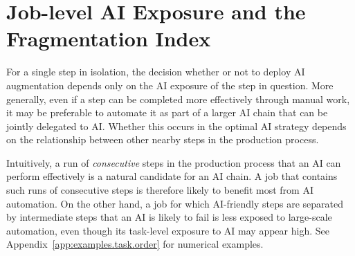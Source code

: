 
\section{Job-level AI Exposure and the Fragmentation Index}
\label{sec:fragmentation}

For a single step in isolation, the decision whether or not to deploy AI augmentation depends 
only on the AI exposure of the step in question. 
More generally, even if a step can be completed more effectively through manual work, it may be preferable to automate it as part of a larger AI chain that can be jointly delegated to AI.  
Whether this occurs in the optimal AI strategy depends on the relationship between other nearby steps in the production process.

Intuitively, a run of \emph{consecutive} steps in the production process that an AI can perform effectively is a natural candidate for an AI chain.  
A job that contains such runs of consecutive steps is therefore likely to benefit most from AI automation.  
On the other hand, a job for which AI-friendly steps are separated by intermediate steps that an AI is likely to fail is less exposed to large-scale automation, even though its task-level exposure to AI may appear high. See Appendix~\ref{app:examples.task.order} for numerical examples.

